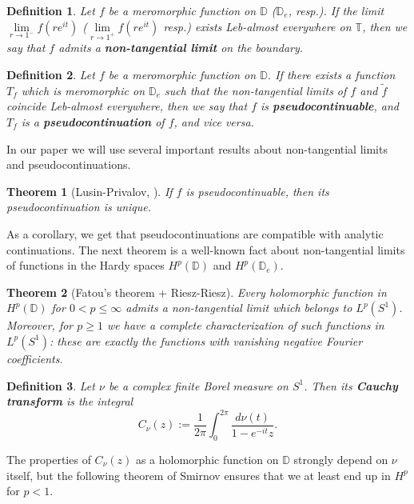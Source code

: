 \documentclass[11pt]{article}
\newtheorem{definition}{Definition}[section]
\newtheorem{theorem}{Theorem}[section]
\begin{document}
\begin{definition}
	Let $f$ be a meromorphic function on $\mathbb{D}$ ($\mathbb{D}_e$, resp.). If the limit $\lim\limits_{r \rightarrow 1^-} f(r e^{it})$ ($\lim\limits_{r \rightarrow 1^+} f(r e^{it})$ resp.) exists Leb-almost everywhere on $\mathbb{T}$, then we say that $f$ admits a \textbf{non-tangential limit} on the boundary.
\end{definition}

\begin{definition}
	Let $f$ be a meromorphic function on $\mathbb{D}$. If there exists a function $T_f$ which is meromorphic on $\mathbb{D}_e$ such that the non-tangential limits of $f$ and $\tilde{f}$ coincide Leb-almost everywhere, then we say that $f$ is \textbf{pseudocontinuable}, and $T_f$ is a \textbf{pseudocontinuation} of $f$, and vice versa.
\end{definition}

In our paper we will use several important results about non-tangential limits and pseudocontinuations.

\begin{theorem}[Lusin-Privalov, \cite{privalov1956randeigenschaften}]
	If $f$ is pseudocontinuable, then its pseudocontinuation is unique.
\end{theorem}

As a corollary, we get that pseudocontinuations are compatible with analytic continuations. The next theorem is a well-known fact about non-tangential limits of functions in the Hardy spaces $H^p(\mathbb{D})$ and $H^p(\mathbb{D}_e)$.

\begin{theorem}[Fatou's theorem + Riesz-Riesz]
	Every holomorphic function in $H^p(\mathbb{D})$ for $0 < p \le \infty$ admits a non-tangential limit which belongs to $L^p(S^1)$. Moreover, for $p \ge 1$ we have a complete characterization of such functions in $L^p(S^1)$: these are exactly the functions with vanishing negative Fourier coefficients.
\end{theorem}

\begin{definition}
	Let $\nu$ be a complex finite Borel measure on $S^1$. Then its \textbf{Cauchy transform} is the integral
	\[
	C_\nu(z) := \frac{1}{2\pi} \int_0^{2 \pi} \dfrac{d \nu(t)}{1 - e^{-it} z}.
	\]
\end{definition}

The properties of $C_\nu(z)$ as a holomorphic function on $\mathbb{D}$ strongly depend on $\nu$ itself, but the following theorem of Smirnov ensures that we at least end up in $H^p$ for $p < 1$.
\end{document}
